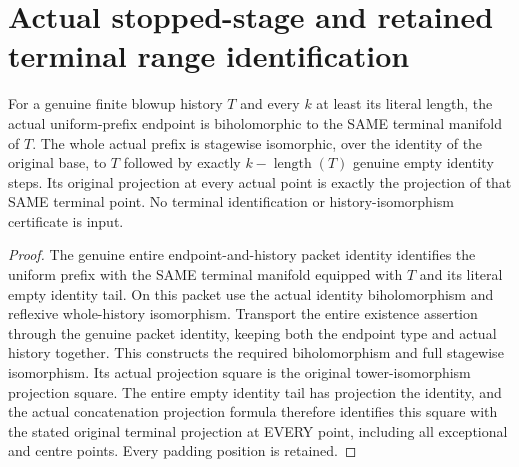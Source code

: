 \section{Actual stopped-stage and retained terminal range identification}

\begin{theorem}
\label{hir:sharp-actual-curve-stopped-prefix-terminal-biholomorphism}
\leanok
For a genuine finite blowup history $T$ and every $k$ at least its literal
length, the actual uniform-prefix endpoint is biholomorphic to the SAME
terminal manifold of $T$. The whole actual prefix is stagewise isomorphic,
over the identity of the original base, to $T$ followed by exactly
$k-\operatorname{length}(T)$ genuine empty identity steps. Its original
projection at every actual point is exactly the projection of that SAME
terminal point. No terminal identification or history-isomorphism
certificate is input.
\end{theorem}
\begin{proof}
The genuine entire endpoint-and-history packet identity identifies the
uniform prefix with the SAME terminal manifold equipped with $T$ and
its literal empty identity tail. On this packet use the actual identity
biholomorphism and reflexive whole-history isomorphism. Transport the
entire existence assertion through the genuine packet identity, keeping
both the endpoint type and actual history together. This constructs the
required biholomorphism and full stagewise isomorphism. Its actual
projection square is the original tower-isomorphism projection square.
The entire empty identity tail has projection the identity, and the
actual concatenation projection formula therefore identifies this square
with the stated original terminal projection at EVERY point, including
all exceptional and centre points. Every padding position is retained.
\end{proof}

